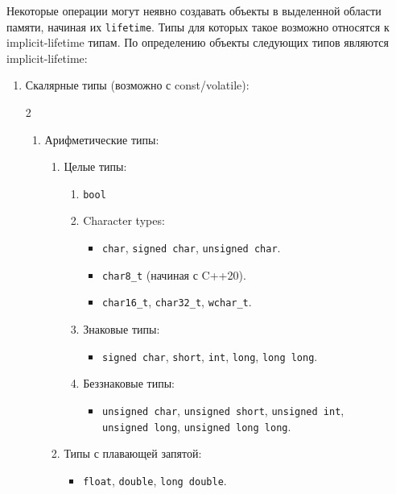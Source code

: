 \documentclass{article}
\begin{document}
Некоторые операции могут неявно создавать объекты в выделенной области памяти, начиная их \verb"lifetime".
Типы для которых такое возможно относятся к implicit-lifetime типам.
По определению объекты следующих типов являются implicit-lifetime:
\begin{enumerate}
\item Скалярные типы (возможно с const/volatile):
\begin{multicols}{2}
\begin{enumerate}
\item Арифметические типы:
\begin{enumerate}
\item Целые типы:
\begin{enumerate}
\item \verb"bool"

\item Character types:
\begin{itemize}
\item \verb"char", \verb"signed char", \verb"unsigned char".

\item \verb"char8_t" (начиная с C++20).

\item \verb"char16_t", \verb"char32_t", \verb"wchar_t".
\end{itemize}

\item Знаковые типы: 
\begin{itemize}
\item \verb"signed char", \verb"short", \verb"int", \verb"long", \verb"long long".
\end{itemize}


\item Беззнаковые типы:
\begin{itemize}
\item \verb"unsigned char", \verb"unsigned short", \verb"unsigned int", \\
\verb"unsigned long", \verb"unsigned long long".
\end{itemize}
\end{enumerate}

\item Типы с плавающей запятой:
\begin{itemize}
\item \verb"float", \verb"double", \verb"long double".
\end{itemize}
\end{enumerate}



\end{enumerate}
\end{multicols}
\end{enumerate}
\end{document}
